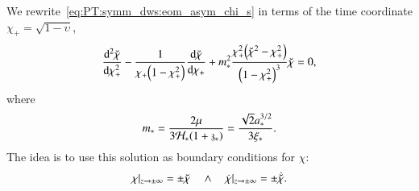 






 



We rewrite~\cref{eq:PT:symm_dws:eom_asym_chi_s} in terms of the time coordinate $\chi_+ =\sqrt{1-\upsilon}$,
\begin{equation}%
    \dv[2]{\brchi}{\chi_+} - \frac{1}{\chi_+ \pclosed{1-\chi_+^2}} \dv{\brchi}{\chi_+} + m_\ast^2 \frac{\chi_+^2 \pclosed{\brchi^2-\chi_+^2}}{\pclosed{1-\chi_+^2}^3}\brchi = 0,
\end{equation}
where
\begin{equation}\label{eq:stablesym:m_ast_def}
    m_\ast= \frac{2\mu}{3\mathcal{H}_\ast {\left( 1+\ensuremath{\mathfrak{z}}_\ast \right)}} = \frac{\sqrt{2}a_\ast^{3/2}}{3\xi_\ast}.
\end{equation}
The idea is to use this solution as boundary conditions for $\chi$:
\begin{equation}
    \chi|_{z\to \pm\infty} =\pm \breve{\chi} \quad \land \quad \dot{\chi}|_{z\to \pm\infty} =\pm \dot{\breve{\chi}}.
\end{equation}

